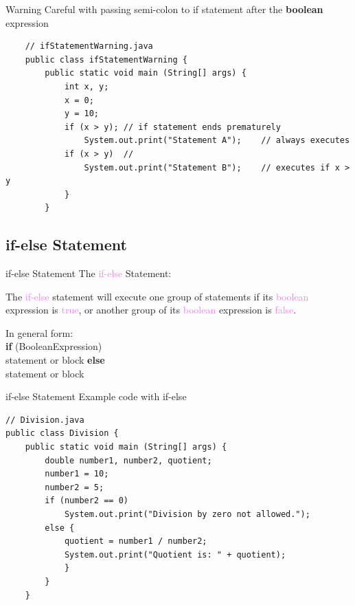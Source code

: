 \documentclass[11pt]{beamer}
\newcommand{\violet}[1]{\textcolor{violet}{#1}}
\begin{document}
\begin{frame}[fragile]{Warning}
    Careful with passing semi-colon to if statement after the \textbf{boolean} expression
    \begin{lstlisting}
    // ifStatementWarning.java
    public class ifStatementWarning {
    	public static void main (String[] args) {
    		int x, y;
    		x = 0; 
    		y = 10;
    		if (x > y);	// if statement ends prematurely
    			System.out.print("Statement A");	// always executes
    		if (x > y)	//
    			System.out.print("Statement B");	// executes if x > y
    		}
        }
    \end{lstlisting}
\end{frame}

\subsection{if-else Statement}
\begin{frame}{if-else Statement}
    The \violet{if-else} Statement:
    \begin{center}
        The \violet{if-else} statement will execute one group of statements if its \violet{boolean} expression is \violet{true}, or another group of its \violet{boolean} expression is \violet{false}.
    \end{center}
    In general form: \\

    \noindent
    \textbf{if} (BooleanExpression) \\
    \hspace{1em} statement or block
    \flushleft \textbf{else} \\ 
    \hspace{1em} statement or block
\end{frame}

\begin{frame}[fragile]{if-else Statement}
    Example code with if-else
        \begin{lstlisting}
// Division.java
public class Division {
    public static void main (String[] args) {
        double number1, number2, quotient;
        number1 = 10;
        number2 = 5;
        if (number2 == 0)
            System.out.print("Division by zero not allowed.");
        else {
            quotient = number1 / number2;
            System.out.print("Quotient is: " + quotient);
            }
        }
    }
    \end{lstlisting}
\end{frame}
\end{document}
